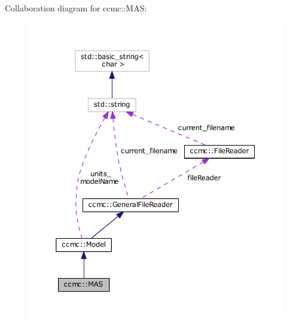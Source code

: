 Collaboration diagram for ccmc\-:\-:M\-A\-S\-:\nopagebreak
\begin{figure}[H]
\begin{center}
\leavevmode
\includegraphics[width=350pt]{classccmc_1_1_m_a_s__coll__graph}
\end{center}
\end{figure}

